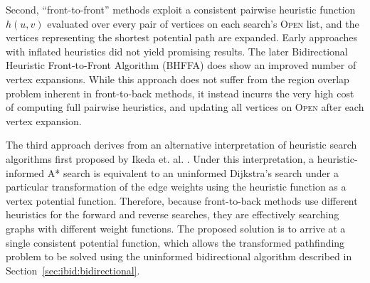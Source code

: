 Second,
``front-to-front'' methods exploit a consistent pairwise
heuristic function $h(u,v)$ evaluated over every pair of vertices
on each search's \textsc{Open} list,
and the vertices representing the shortest potential path are
expanded.
Early approaches with inflated heuristics
\citep{doran1966doubletree} did not yield promising results.
The later Bidirectional Heuristic Front-to-Front Algorithm
(BHFFA) \citep{champeaux1983biheuragain} does show an improved
number of vertex expansions.
While this approach does not suffer from the region overlap problem
inherent in front-to-back methods,
it instead incurrs the very high cost of computing full pairwise
heuristics, and updating all vertices on \textsc{Open}
after each vertex expansion.

The third approach
derives from an alternative interpretation of heuristic search
algorithms first proposed by Ikeda et. al.
\citep{ikeda1994betterroutes}.
Under this interpretation,
a heuristic-informed A* search is equivalent to an uninformed
Dijkstra's search under a particular transformation
of the edge weights using the heuristic function
as a vertex potential function.
Therefore,
because front-to-back methods use different heuristics for the
forward and reverse searches,
they are effectively searching graphs with different weight functions.
The proposed solution is to arrive at a single consistent potential
function,
which allows the transformed pathfinding problem to be solved using
the uninformed bidirectional algorithm described
in Section~\ref{sec:ibid:bidirectional}.

